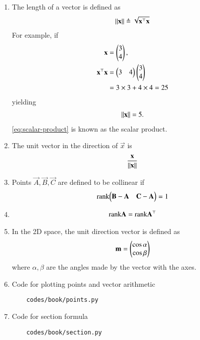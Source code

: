 \begin{enumerate}[label=\thesubsection.\arabic*.,ref=\thesubsection.\theenumi]
	\item The length of a vector  is  defined as
		\begin{align}
		\label{eq:side-length}
			 \left\lVert\mathbf{x}\right\rVert \triangleq \sqrt{\mathbf{x}^{\top}\mathbf{x}}
		\end{align}
		For example, if 
\begin{align}
\mathbf{x}
	&=\begin{pmatrix}3 \\ 4\end{pmatrix},
	\\
	\mathbf{x}^{\top}\mathbf{x} &= \begin{pmatrix}3 & 4\end{pmatrix}\begin{pmatrix}3 \\ 4\end{pmatrix}
	\label{eq:scalar-product}
	\\
	&=3 \times 3 + 4 \times 4 = 25
\end{align}
yielding
		\begin{align}
			 \left\lVert\mathbf{x}\right\rVert = 5.
		\end{align}
	\eqref{eq:scalar-product}
	is known as the scalar product.
	\item The unit vector in the direction of $\vec{x}$ is 
		\begin{align}
		\label{eq:unit-vec}
			 \frac{\mathbf{x}}{\left\lVert\mathbf{x}\right\rVert} 
		\end{align}
		\iffalse
\item   For a 2D space, 
	points $\vec{A}, \vec{B}, \vec{C}$ are defined to be collinear if 
		\fi
	\item 
	Points $\vec{A}, \vec{B}, \vec{C}$ are defined to be collinear if 
		\begin{align}
			\label{eq:line-rank-2}
			\text{rank}{\ensuremath{\begin{pmatrix}\mathbf{B}-\mathbf{A}& \mathbf{C}-\mathbf{A}\end{pmatrix}}} = 1
		\end{align}
	\item 
\begin{align}
			\label{eq:mat-rank-t}
	\text{rank}{\mathbf{A}}
	=
	\text{rank}{\mathbf{A}^\top}
\end{align}
\item In the 2D space, the unit direction vector is defined as
\begin{align}
		\label{eq:dir-vec-3d}
\mathbf{m}=\begin{pmatrix}\cos \alpha\\ \cos \beta \end{pmatrix}
\end{align}
where ${ \alpha,  \beta }$ are the angles made by the vector with the axes.
\item Code for plotting points and vector arithmetic
	\begin{lstlisting}
	codes/book/points.py
\end{lstlisting}
\item Code for section formula 
	\begin{lstlisting}
	codes/book/section.py
\end{lstlisting}
\end{enumerate}
